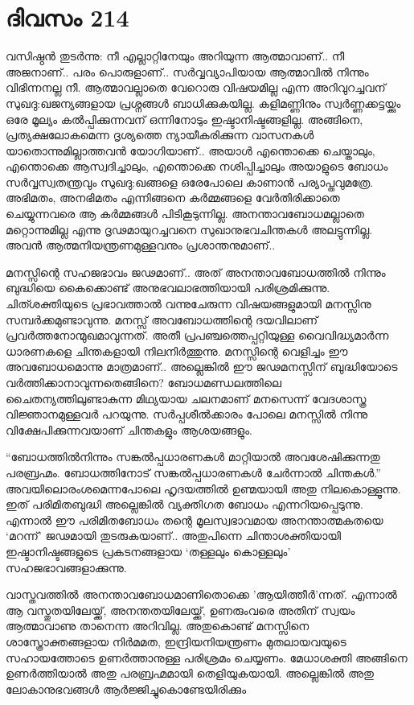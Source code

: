 \section{ദിവസം 214}


വസിഷ്ഠൻ തുടർന്നു: നീ എല്ലാറ്റിനേയും അറിയുന്ന ആത്മാവാണ്‌..  നീ അജനാണ്‌.. പരം പൊരുളാണ്‌..  സർവ്വവ്യാപിയായ ആത്മാവിൽ നിന്നും വിഭിന്നനല്ല നീ. ആത്മാവല്ലാതെ വേറൊരു വിഷയമില്ല എന്ന അറിവുറച്ചവന്‌ സുഖദു:ഖജന്യങ്ങളായ പ്രശ്നങ്ങൾ ബാധിക്കുകയില്ല. കളിമണ്ണിനും സ്വർണ്ണക്കട്ടയ്ക്കും ഒരേ മൂല്യം കൽപ്പിക്കുന്നവന്‌ ഒന്നിനോടും ഇഷ്ടാനിഷ്ടങ്ങളില്ല. അങ്ങിനെ, പ്രത്യക്ഷലോകമെന്ന ദൃശ്യത്തെ ന്യായീകരിക്കുന്ന വാസനകൾ യാതൊന്നുമില്ലാത്തവൻ യോഗിയാണ്‌..  അയാൾ എന്തൊക്കെ ചെയ്താലും, എന്തൊക്കെ ആസ്വദിച്ചാലും, എന്തൊക്കെ നശിപ്പിച്ചാലും അയാളുടെ ബോധം സർവ്വസ്വതന്ത്രവും സുഖദു:ഖങ്ങളെ ഒരേപോലെ കാണാൻ പര്യാപ്തവുമത്രേ. അഭിമതം, അനഭിമതം എന്നിങ്ങനെ കർമ്മങ്ങളെ വേർതിരിക്കാതെ ചെയ്യുന്നവരെ ആ കർമ്മങ്ങൾ പിടികൂടുന്നില്ല. അനന്താവബോധമല്ലാതെ മറ്റൊന്നുമില്ല എന്നു ദൃഢമായുറച്ചവനെ സുഖാനുഭവചിന്തകൾ അലട്ടുന്നില്ല. അവൻ ആത്മനിയന്ത്രണമുള്ളവനും പ്രശാന്തനുമാണ്‌.. 

മനസ്സിന്റെ സഹജഭാവം ജഢമാണ്‌..  അത് അനന്താവബോധത്തിൽ നിന്നും ബുദ്ധിയെ കൈക്കൊണ്ട് അനുഭവലാഭത്തിയായി പരിശ്രമിക്കുന്നു. ചിത്ശക്തിയുടെ പ്രഭാവത്താൽ വന്നുചേരുന്ന വിഷയങ്ങളുമായി മനസ്സിനു സമ്പർക്കമുണ്ടാവുന്നു. മനസ്സ് അവബോധത്തിന്റെ ദയവിലാണ്‌ പ്രവർത്തനോന്മുഖമാവുന്നത്. അതീ പ്രപഞ്ചത്തെപ്പറ്റിയുള്ള വൈവിദ്ധ്യമാർന്ന ധാരണകളെ ചിന്തകളായി നിലനിർത്തുന്നു. മനസ്സിന്റെ വെളിച്ചം ഈ അവബോധമൊന്നു മാത്രമാണ്‌..  അല്ലെങ്കിൽ ഈ ജഢമനസ്സിന്‌ ബുദ്ധിയോടെ വർത്തിക്കാനാവുന്നതെങ്ങിനെ? ബോധമണ്ഡലത്തിലെ ചൈതന്യത്തിലുണ്ടാകുന്ന മിഥ്യയായ ചലനമാണ്‌ മനസെന്ന് വേദശാസ്ത്ര വിജ്ഞാനമുള്ളവർ പറയുന്നു. സർപ്പശീൽക്കാരം പോലെ മനസ്സിൽ നിന്നു വിക്ഷേപിക്കുന്നവയാണ്‌ ചിന്തകളും ആശയങ്ങളും.

“ബോധത്തിൽനിന്നും സങ്കൽപ്പധാരണകൾ മാറ്റിയാല്‍ അവശേഷിക്കുന്നതു പരബ്രഹ്മം. ബോധത്തിനോട് സങ്കൽപ്പധാരണകൾ ചേർന്നാൽ ചിന്തകൾ.” അവയിലൊരംശമെന്നപോലെ ഹൃദയത്തിൽ ഉണ്മയായി അതു നിലകൊള്ളൂന്നു. ഇത്‌ പരിമിതബുദ്ധി അല്ലെങ്കിൽ വ്യക്തിഗത ബോധം എന്നറിയപ്പെടുന്നു. എന്നാൽ ഈ പരിമിതബോധം തന്റെ മൂലസ്വഭാവമായ അനന്താത്മകതയെ ‘മറന്ന്’ ജഢമായി തുടരുകയാണ്‌..  അതുപിന്നെ ചിന്താശക്തിയായി ഇഷ്ടാനിഷ്ടങ്ങളുടെ പ്രകടനങ്ങളായ ‘തള്ളലും കൊള്ളലും’ സഹജഭാവങ്ങളാക്കുന്നു.

വാസ്തവത്തിൽ അനന്താവബോധമാണിതൊക്കെ 'ആയിത്തീർ'ന്നത്. എന്നാൽ ആ വസ്തുതയിലേയ്ക്ക്, അനന്തതയിലേയ്ക്ക്, ഉണരുംവരെ അതിന്‌ സ്വയം ആത്മാവാണു താനെന്ന അറിവില്ല. അതുകൊണ്ട് മനസ്സിനെ ശാസ്ത്രോക്തങ്ങളായ നിർമമത, ഇന്ദ്രിയനിയന്ത്രണം മുതലായവയുടെ സഹായത്തോടെ ഉണർത്താനുള്ള പരിശ്രമം ചെയ്യണം. മേധാശക്തി അങ്ങിനെ ഉണർത്തിയാൽ അതു പരബ്രഹ്മമായി തെളിയുകയായി. അല്ലെങ്കിൽ അതു ലോകാനുഭവങ്ങൾ ആർജ്ജിച്ചുകൊണ്ടേയിരിക്കും 
